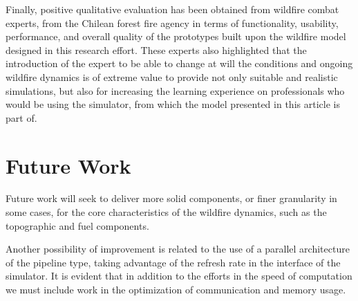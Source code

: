 \documentclass[conference]{IEEEtran}
\begin{document}
    Finally, positive qualitative evaluation has been obtained from wildfire combat experts, from the Chilean forest 
    fire agency in terms of functionality, usability, performance, and overall quality of the prototypes built upon the 
    wildfire model designed in this research effort. These experts also highlighted that the introduction of the 
    expert to be able to change at will the conditions and ongoing wildfire dynamics is of extreme value to provide 
    not only suitable and realistic simulations, but also for increasing the learning experience on professionals who
    would be using the simulator, from which the model presented in this article is part of.
    
    
  \section{Future Work}
    
    Future work will seek to deliver more solid components, or finer granularity in some cases, for the core 
    characteristics of the wildfire dynamics, such as the topographic and fuel components. \medskip
    
    Another possibility of improvement is related to the use of a parallel architecture of the pipeline type, 
    taking advantage of the refresh rate in the interface of the simulator. It is evident that in addition to 
    the efforts in the speed of computation we must include work in the optimization of communication and memory usage.


%
\end{document}
